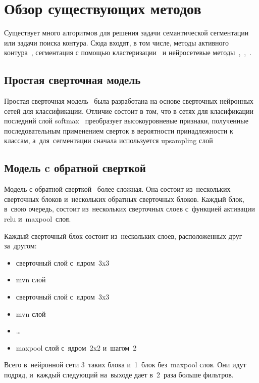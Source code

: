 \section{Обзор существующих методов}

Существует много алгоритмов для решения задачи семантической сегментации или задачи поиска контура. Сюда входят, в том числе, методы активного контура~\cite{snakes}, сегментация с помощью кластеризации~\cite{clustering_segm} и нейросетевые методы~\cite{fcn},~\cite{unet},~\cite{gridnet}.

\subsection{Простая сверточная модель}

Простая сверточная модель~\cite{fcn_1_layer_upsample} была разработана на основе сверточных нейронных сетей для классификации. Отличие состоит в том, что в сетях для класификации последний слой softmax~\cite{classification_loss} преобразует высокоуровневые признаки, полученные последовательным применением сверток в вероятности принадлежности к классам, а~для~сегментации сначала используется upsampling слой 

\subsection{Модель c обратной сверткой}
 
Модель с обратной сверткой~\cite{fcn} более сложная. Она состоит из~нескольких сверточных блоков и~нескольких обратных сверточных блоков. Каждый блок, в~свою очередь, состоит из~нескольких сверточных слоев с~функцией активации relu и~maxpool~слоя. 

Каждый сверточный блок состоит из~нескольких слоев, расположенных друг за~другом:

\begin{itemize}
  \item сверточный слой с~ядром~3x3
  \item mvn слой
  \item сверточный слой с~ядром~3x3
  \item mvn слой
  \item \dots
  \item maxpool слой с~ядром~2x2 и~шагом~2
\end{itemize}

Всего в~нейронной сети 3~таких блока и~1~блок без~maxpool слоя. Они идут подряд, и~каждый следующий на~выходе дает в~2~раза больше фильтров. 

